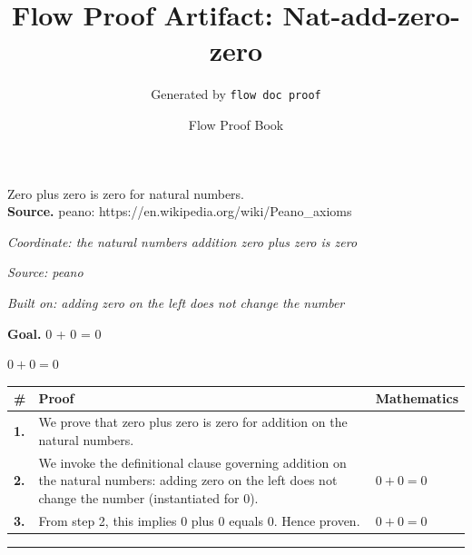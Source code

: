 \documentclass[11pt]{article}
\title{Flow Proof Artifact: Nat-add-zero-zero}
\author{Generated by \texttt{flow doc proof}}
\date{Flow Proof Book}
\theoremstyle{definition}
\begin{document}
\maketitle
Zero plus zero is zero for natural numbers.\\[0.5em]
\textbf{Source.} peano: https://en.wikipedia.org/wiki/Peano\_axioms\\[0.5em]
\bigskip
{}\par
\smallskip\noindent\textit{Coordinate: the natural numbers \cdot addition \cdot zero plus zero is zero}\par
\smallskip\noindent\textit{Source: peano}\par
\smallskip\noindent\textit{Built on: adding zero on the left does not change the number}\par
\medskip
\noindent\textbf{Goal.} 0 + 0 = 0\par
\noindent$\displaystyle 0 + 0 = 0$\par
\medskip
\noindent
\begin{tabular}{@{} >{\raggedright\arraybackslash}p{} >{\raggedright\arraybackslash}p{} >{\raggedleft\arraybackslash}p{} @{}}
\textbf{\#} & \textbf{Proof} & \textbf{Mathematics} \\
\midrule
\textbf{1.} & We prove that zero plus zero is zero for addition on the natural numbers. & \\[0.45em]
\textbf{2.} & We invoke the definitional clause governing addition on the natural numbers: adding zero on the left does not change the number (instantiated for 0). & $\displaystyle 0 + 0 = 0$ \\[0.45em]
\textbf{3.} & From step 2, this implies 0 plus 0 equals 0. Hence proven. & $\displaystyle 0 + 0 = 0$ \\[0.45em]
\bottomrule
\end{tabular}
\label{thm:Nat-addition-zero_plus_zero_is_zero}
\par\medskip\hrule
\end{document}
